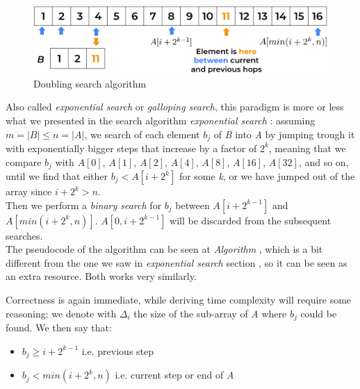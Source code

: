 \begin{figure}[H] 
    \begin{center}
        \includegraphics[width=.8\textwidth]{imgs/galloping.png}
        \caption{Doubling search algorithm \label{fig:galloping}}
    \end{center}
\end{figure}

Also called \textit{exponential search} or \textit{galloping search}, this paradigm is more or less what we presented in the search algorithm \textit{exponential search} : assuming $m=|B| \leq n=|A|$, we search of each element $b_j$ of \textit{B} into \textit{A} by jumping trough it with exponentially bigger steps that increase by a factor of $2^k$, meaning that we compare $b_j$ with $A[0]$, $A[1]$, $A[2]$, $A[4]$, $A[8]$, $A[16]$, $A[32]$, and so on, until we find that either $b_j<A\left[i+2^k\right]$ for some \textit{k}, or we have jumped out of the array since $i+2^k>n$.\\
Then we perform a \textit{binary search}  for $b_j$ between $A\left[i+2^{k-1}\right]$ and $A\left[min\left(i+2^k, n\right)\right]$. $A\left[0, i+2^{k-1}\right]$ will be discarded from the subsequent searches.\\
The pseudocode of the algorithm can be seen at \textit{Algorithm} , which is a bit different from the one we saw in \textit{exponential search} section , so it can be seen as an extra resource. Both works very similarly.

Correctness is again immediate, while deriving time complexity will require some reasoning: we denote with $\Delta_i$ the size of the sub-array of \textit{A} where $b_j$ could be found.
We then say that:
\begin{itemize} 
    \item $b_j \geq i+2^{k-1}$ i.e. previous step
    \item $b_j<min\left(i+2^k,n\right)$ i.e. current step or end of \textit{A}
\end{itemize}

